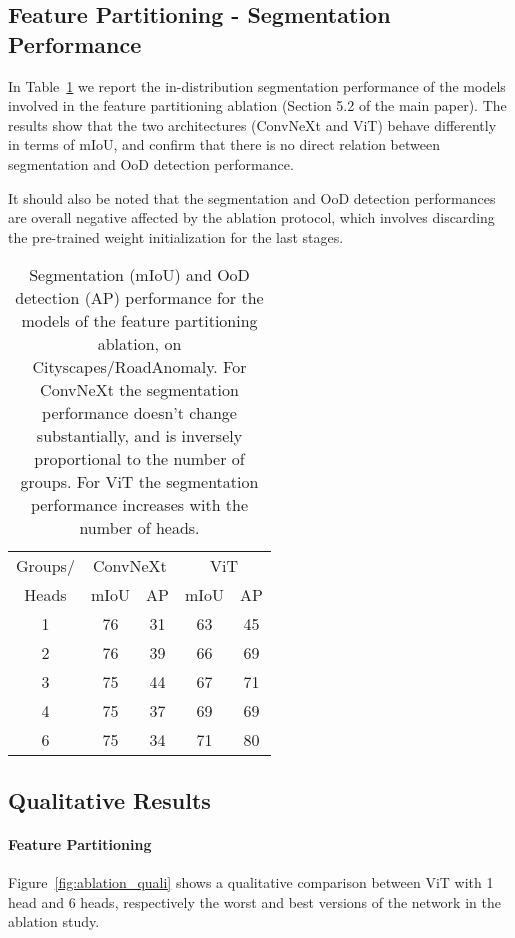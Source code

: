 \documentclass[10pt,twocolumn,letterpaper]{article}
\begin{document}
\subsection{Feature Partitioning - Segmentation Performance}
In Table~\ref{tab:ablation_miou} we report the in-distribution segmentation performance of the models involved in the feature partitioning ablation (Section 5.2 of the main paper). The results show that the two architectures (ConvNeXt and ViT) behave differently in terms of mIoU, and confirm that there is no direct relation between segmentation and OoD detection performance.

It should also be noted that the segmentation and OoD detection performances are overall negative affected by the ablation protocol, which involves discarding the pre-trained weight initialization for the last stages.

\begin{table}
    \centering
    \small
    \begin{tabular}{c|c|c|c|c}
    \toprule
        Groups/ & \multicolumn{2}{c|}{ConvNeXt} & \multicolumn{2}{c}{ViT}\\
        Heads & mIoU & AP & mIoU & AP \\
        \midrule
        1 & 76 & 31 & 63 & 45\\
        2 & 76 & 39 & 66 & 69\\
        3 & 75 & 44 & 67 & 71\\
        4 & 75 & 37 & 69 & 69\\
        6 & 75 & 34 & 71 & 80\\
    \bottomrule
    \end{tabular}
    \caption{Segmentation (mIoU) and OoD detection (AP) performance for the models of the feature partitioning ablation, on Cityscapes/RoadAnomaly. For ConvNeXt the segmentation performance doesn't change substantially, and is inversely proportional to the number of groups. For ViT the segmentation performance increases with the number of heads.}
    \label{tab:ablation_miou}
\end{table}



\subsection{Qualitative Results}
\paragraph{Feature Partitioning}
Figure~\ref{fig:ablation_quali} shows a qualitative comparison between ViT with 1 head and 6 heads, respectively the worst and best versions of the network in the ablation study.
\end{document}
